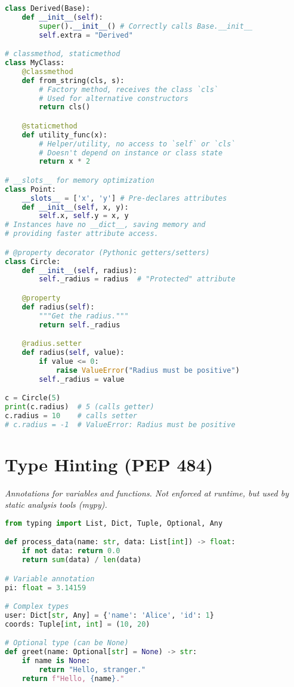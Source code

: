 \documentclass[8pt,landscape]{article}
\begin{document}
\begin{multicols}{3}
\begin{lstlisting}[language=Python]
class Derived(Base):
    def __init__(self):
        super().__init__() # Correctly calls Base.__init__
        self.extra = "Derived"

# classmethod, staticmethod
class MyClass:
    @classmethod
    def from_string(cls, s):
        # Factory method, receives the class `cls`
        # Used for alternative constructors
        return cls()

    @staticmethod
    def utility_func(x):
        # Helper/utility, no access to `self` or `cls`
        # Doesn't depend on instance or class state
        return x * 2

# __slots__ for memory optimization
class Point:
    __slots__ = ['x', 'y'] # Pre-declares attributes
    def __init__(self, x, y):
        self.x, self.y = x, y
# Instances have no __dict__, saving memory and
# providing faster attribute access.

# @property decorator (Pythonic getters/setters)
class Circle:
    def __init__(self, radius):
        self._radius = radius  # "Protected" attribute

    @property
    def radius(self):
        """Get the radius."""
        return self._radius

    @radius.setter
    def radius(self, value):
        if value <= 0:
            raise ValueError("Radius must be positive")
        self._radius = value

c = Circle(5)
print(c.radius)  # 5 (calls getter)
c.radius = 10    # calls setter
# c.radius = -1  # ValueError: Radius must be positive
\end{lstlisting}

\section*{Type Hinting (PEP 484)}
\textit{Annotations for variables and functions. Not enforced at runtime, but used by static analysis tools (mypy).}
\begin{lstlisting}[language=Python]
from typing import List, Dict, Tuple, Optional, Any

def process_data(name: str, data: List[int]) -> float:
    if not data: return 0.0
    return sum(data) / len(data)

# Variable annotation
pi: float = 3.14159

# Complex types
user: Dict[str, Any] = {'name': 'Alice', 'id': 1}
coords: Tuple[int, int] = (10, 20)

# Optional type (can be None)
def greet(name: Optional[str] = None) -> str:
    if name is None:
        return "Hello, stranger."
    return f"Hello, {name}."
\end{lstlisting}


\end{multicols}
\end{document}

